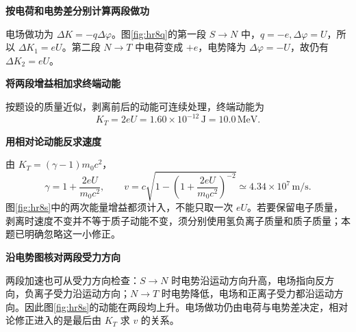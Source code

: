 \begin{solution}\textbf{按电荷和电势差分别计算两段做功}\par\nobreak
电场做功为 $\Delta K=-q\Delta\varphi$。图\ref{fig:hr8q}的第一段 $S\to N$ 中，$q=-e,\Delta\varphi=U$，所以 $\Delta K_1=eU$。第二段 $N\to T$ 中电荷变成 $+e$，电势降为 $\Delta\varphi=-U$，故仍有 $\Delta K_2=eU$。



\par\medskip{}\noindent\textbf{将两段增益相加求终端动能}\par\nobreak
按题设的质量近似，剥离前后的动能可连续处理，终端动能为
\[
K_T=2eU=1.60\times10^{-12}\,\mathrm J=10.0\,\mathrm{MeV}.
\]


\par\medskip{}\noindent\textbf{用相对论动能反求速度}\par\nobreak
由 $K_T=(\gamma-1)m_0c^2$，
\[
\gamma=1+\frac{2eU}{m_0c^2},\qquad
\boxed{v=c\sqrt{1-\left(1+\frac{2eU}{m_0c^2}\right)^{-2}}}
\simeq4.34\times10^7\,\mathrm{m/s}.
\]
图\ref{fig:hr8s}中的两次能量增益都须计入，不能只取一次 $eU$。若要保留电子质量，剥离时速度不变并不等于质子动能不变，须分别使用氢负离子质量和质子质量；本题已明确忽略这一小修正。



\par\medskip{}\noindent\textbf{沿电势图核对两段受力方向}\par\nobreak
两段加速也可从受力方向检查：$S\to N$ 时电势沿运动方向升高，电场指向反方向，负离子受力沿运动方向；$N\to T$ 时电势降低，电场和正离子受力都沿运动方向。因此图\ref{fig:hr8s}的动能在两段均上升。电场做功仍由电荷与电势差决定，相对论修正进入的是最后由 $K_T$ 求 $v$ 的关系。

\end{solution}

